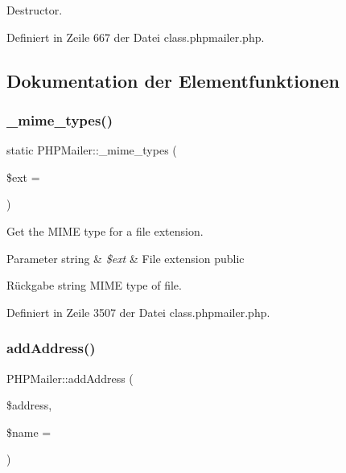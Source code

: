 Destructor. 

Definiert in Zeile 667 der Datei class.\+phpmailer.\+php.



\subsection{Dokumentation der Elementfunktionen}
\mbox{\label{class_p_h_p_mailer_ac31fdaba7cf01c43f9719cf63e8a5ef6}} 
\subsubsection{\texorpdfstring{\+\_\+mime\+\_\+types()}{\_mime\_types()}}
{\footnotesize\ttfamily static P\+H\+P\+Mailer\+::\+\_\+mime\+\_\+types (\begin{DoxyParamCaption}\item[{}]{\$ext = {\ttfamily \textquotesingle{}\textquotesingle{}} }\end{DoxyParamCaption})\hspace{0.3cm}{\ttfamily [static]}}

Get the M\+I\+ME type for a file extension. 
\begin{DoxyParams}[1]{Parameter}
string & {\em \$ext} & File extension  public \\
\hline
\end{DoxyParams}
\begin{DoxyReturn}{Rückgabe}
string M\+I\+ME type of file. 
\end{DoxyReturn}


Definiert in Zeile 3507 der Datei class.\+phpmailer.\+php.

\mbox{\label{class_p_h_p_mailer_a710206c4b4c43b43f352fb8e139cd0da}} 
\subsubsection{\texorpdfstring{add\+Address()}{addAddress()}}
{\footnotesize\ttfamily P\+H\+P\+Mailer\+::add\+Address (\begin{DoxyParamCaption}\item[{}]{\$address,  }\item[{}]{\$name = {\ttfamily \textquotesingle{}\textquotesingle{}} }\end{DoxyParamCaption})}

